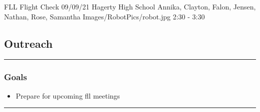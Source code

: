 \insertmeeting 
	{FLL Flight Check} 
	{09/09/21}
	{Hagerty High School}
	{Annika, Clayton, Falon, Jensen, Nathan, Rose, Samantha}
	{Images/RobotPics/robot.jpg}
	{2:30 - 3:30}
	
\subsection*{Outreach}
\noindent\hfil\rule{\textwidth}{.4pt}\hfil
\subsubsection*{Goals}
\begin{itemize}
    \item Prepare for upcoming fll meetings 

\end{itemize} 

\noindent\hfil\rule{\textwidth}{.4pt}\hfil

